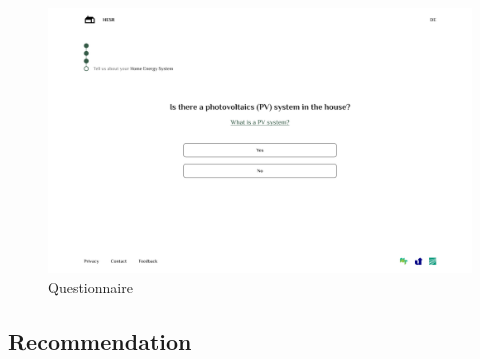 \begin{figure}[h!]
  \centering
  \includegraphics[width=\textwidth]{Images/question.png}
  \caption{Questionnaire}
  \label{fig:question}
\end{figure}


\subsection*{Recommendation}

